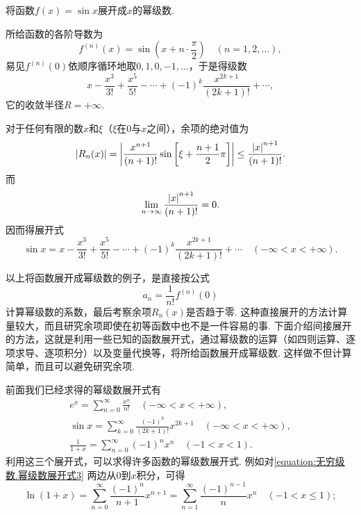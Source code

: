 \begin{example}
将函数\(f(x) = \sin x\)展开成\(x\)的幂级数.
\begin{solution}
所给函数的各阶导数为\begin{equation*}
	f^{(n)}(x) = \sin\left(x + n\cdot\frac{\pi}{2}\right)
	\quad(n=1,2,\dotsc),
\end{equation*}
易见\(f^{(n)}(0)\)依顺序循环地取\(0,1,0,-1,\dotsc\)，于是得级数\begin{equation*}
	x-\frac{x^3}{3!}+\frac{x^5}{5!}-\dotsb+(-1)^k \frac{x^{2k+1}}{(2k+1)!}+\dotsb,
\end{equation*}
它的收敛半径\(R=+\infty\).

对于任何有限的数\(x\)和\(\xi\)（\(\xi\)在\(0\)与\(x\)之间），余项的绝对值为\begin{equation*}
	\abs{R_n(x)}
	= \abs{ \frac{x^{n+1}}{(n+1)!} \sin\left[\xi+\frac{n+1}{2}\pi\right] }
	\leq \frac{\abs{x}^{n+1}}{(n+1)!}.
\end{equation*}
而\begin{equation*}
	\lim_{n\to\infty} \frac{\abs{x}^{n+1}}{(n+1)!} = 0.
\end{equation*}
因而得展开式\begin{equation*}
	\sin x = x-\frac{x^3}{3!}+\frac{x^5}{5!}-\dotsb+(-1)^k \frac{x^{2k+1}}{(2k+1)!}+\dotsb
	\quad(-\infty<x<+\infty).
\end{equation*}
\end{solution}
\end{example}

以上将函数展开成幂级数的例子，是直接按公式\begin{equation*}
a_n = \frac{1}{n!} f^{(n)}(0)
\end{equation*}计算幂级数的系数，最后考察余项\(R_n(x)\)是否趋于零.
这种直接展开的方法计算量较大，而且研究余项即使在初等函数中也不是一件容易的事.
下面介绍间接展开的方法，这就是利用一些已知的函数展开式，通过幂级数的运算（如四则运算、逐项求导、逐项积分）以及变量代换等，将所给函数展开成幂级数.
这样做不但计算简单，而且可以避免研究余项.

前面我们已经求得的幂级数展开式有\begin{gather}
	e^x = \sum_{n=0}^\infty \frac{x^n}{n!}
		\quad(-\infty<x<+\infty), \label{equation:无穷级数.幂级数展开式1} \\
	\sin x = \sum_{k=0}^\infty \frac{(-1)^k}{(2k+1)!} x^{2k+1}
		\quad(-\infty<x<+\infty), \label{equation:无穷级数.幂级数展开式2} \\
	\frac{1}{1+x} = \sum_{n=0}^\infty (-1)^n x^n
		\quad(-1<x<1). \label{equation:无穷级数.幂级数展开式3}
\end{gather}
利用这三个展开式，可以求得许多函数的幂级数展开式.
例如对\cref{equation:无穷级数.幂级数展开式3} 两边从\(0\)到\(x\)积分，可得
\begin{equation}\label{equation:无穷级数.幂级数展开式4}
	\ln(1+x) = \sum_{n=0}^\infty \frac{(-1)^n}{n+1} x^{n+1}
	= \sum_{n=1}^\infty \frac{(-1)^{n-1}}{n} x^n
	\quad(-1<x\leq1);
\end{equation}

